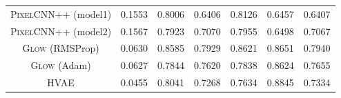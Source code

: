 {\begin{table}[tb]
{\begin{tabular}{ccccccc}
            \textsc{PixelCNN++} (model1)  & 0.1553 & 0.8006 & 0.6406 & 0.8126 & 0.6457 & 0.6407 \\
            \textsc{PixelCNN++} (model2) & 0.1567 & 0.7923 & 0.7070 & 0.7955 & 0.6498 &  0.7067\\
            \textsc{Glow} (RMSProp)  & 0.0630 & 0.8585 & 0.7929 & 0.8621 & 0.8651 &  0.7940\\
            \textsc{Glow} (Adam)   & 0.0627 & 0.7844 & 0.7620 &  0.7838 &  0.8624 &  0.7655 \\
            \textsc{HVAE}  & 0.0455 & 0.8041 &  0.7268 & 0.7634 & 0.8845 & 0.7334\\
            \bottomrule
        \end{tabular}
        \label{tab_modelagnostic:mmd}
    }
    \vspace*{-0.85\baselineskip}
\end{table}


}
